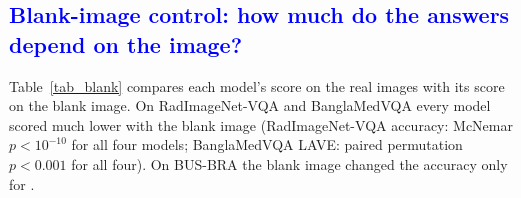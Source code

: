 \subsection{\textcolor{blue}{Blank-image control: how much do the answers depend on the image?}}
\label{sec_res_blank}
{\color{blue}
Table~\ref{tab_blank} compares each model's score on the real images with its score on the blank image. On RadImageNet-VQA and BanglaMedVQA every model scored much lower with the blank image (RadImageNet-VQA accuracy: McNemar $p<10^{-10}$ for all four models; BanglaMedVQA LAVE: paired permutation $p<0.001$ for all four). On BUS-BRA the blank image changed the accuracy only for \medgemma{}.
}

\begin{table}[tb]
\color{blue}
\centering
\caption{Real-image $\rightarrow$ blank-image scores. Accuracy (\%) on BUS-BRA (chance 50\%) and RadImageNet-VQA (chance 40\% over the 500 questions), and mean LAVE (\%) on BanglaMedVQA. The blank image is white for RadImageNet-VQA and BanglaMedVQA; on BUS-BRA the white and black images gave identical results.}
\label{tab_blank}
\footnotesize
\setlength{\tabcolsep}{3pt}
\end{table}

